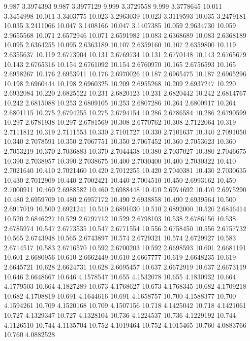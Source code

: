 9.987 3.3974393
9.987 3.3977129
9.999 3.3729558
9.999 3.3778645
10.011 3.3454998
10.011 3.3403775
10.023 3.2963039
10.023 3.3119593
10.035 3.2479181
10.035 3.2411066
10.047 3.1408166
10.047 3.1407385
10.059 2.9634730
10.059 2.9655568
10.071 2.6572946
10.071 2.6591982
10.083 2.6368689
10.083 2.6368189
10.095 2.6364255
10.095 2.6363189
10.107 2.6359160
10.107 2.6359800
10.119 2.6355637
10.119 2.6773904
10.131 2.6769734
10.131 2.6770148
10.143 2.6765679
10.143 2.6765316
10.154 2.6761092
10.154 2.6760970
10.165 2.6756593
10.165 2.6958267
10.176 2.6953911
10.176 2.6970026
10.187 2.6965475
10.187 2.6965296
10.198 2.6960444
10.198 2.6960325
10.209 2.6955268
10.209 2.6937247
10.220 2.6932084
10.220 2.6825522
10.231 2.6820123
10.231 2.6820442
10.242 2.6814767
10.242 2.6815088
10.253 2.6809105
10.253 2.6807286
10.264 2.6800917
10.264 2.6801115
10.275 2.6794255
10.275 2.6794154
10.286 2.6786584
10.286 2.6790599
10.297 2.6781938
10.297 2.6781569
10.308 2.6770762
10.308 2.7122064
10.319 2.7111812
10.319 2.7111553
10.330 2.7101727
10.330 2.7101637
10.340 2.7091050
10.340 2.7078591
10.350 2.7067751
10.350 2.7067452
10.360 2.7053623
10.360 2.7053219
10.370 2.7036883
10.370 2.7044438
10.380 2.7037027
10.380 2.7046675
10.390 2.7038957
10.390 2.7038675
10.400 2.7030400
10.400 2.7030322
10.410 2.7021640
10.410 2.7021460
10.420 2.7012255
10.420 2.7040381
10.430 2.7030635
10.430 2.7012909
10.440 2.7002421
10.440 2.7004510
10.450 2.6993162
10.450 2.7000911
10.460 2.6988582
10.460 2.6988448
10.470 2.6974692
10.470 2.6975290
10.480 2.6959709
10.480 2.6957172
10.490 2.6938858
10.490 2.6939564
10.500 2.6917019
10.500 2.6921241
10.510 2.6891030
10.510 2.6892000
10.520 2.6846414
10.520 2.6846227
10.529 2.6797712
10.529 2.6798103
10.538 2.6786156
10.538 2.6785974
10.547 2.6773535
10.547 2.6771554
10.556 2.6758450
10.556 2.6757732
10.565 2.6743948
10.565 2.6743897
10.574 2.6729321
10.574 2.6729927
10.583 2.6714517
10.583 2.6716570
10.592 2.6700203
10.592 2.6698593
10.601 2.6681191
10.601 2.6680956
10.610 2.6662449
10.610 2.6667777
10.619 2.6648235
10.619 2.6645721
10.628 2.6624731
10.628 2.6695457
10.637 2.6672919
10.637 2.6673119
10.646 2.6648667
10.646 4.1578547
10.655 4.1532078
10.655 4.1830932
10.664 4.1779503
10.664 4.1827289
10.673 4.1768627
10.673 4.1768345
10.682 4.1709218
10.682 4.1708819
10.691 4.1644616
10.691 4.1658757
10.700 4.1588377
10.700 4.1594261
10.709 4.1520168
10.709 4.1507156
10.718 4.1425042
10.718 4.1421061
10.727 4.1329347
10.727 4.1328104
10.736 4.1224537
10.736 4.1229192
10.744 4.1126510
10.744 4.1135704
10.752 4.1019464
10.752 4.1015465
10.760 4.0883766
10.760 4.0882528

